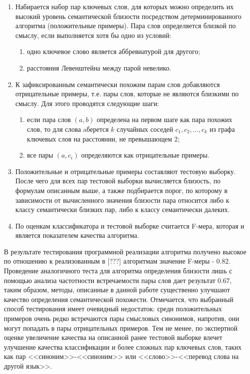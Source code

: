 \begin{enumerate}
    \item Набирается набор пар ключевых слов, для которых можно  определить их высокий уровень семантической близости посредством детерминированного алгоритма (положительные примеры). Пара слов определяется близкой по смыслу, если выполняется хотя бы одно из условий:
    \begin{enumerate} 
        \item одно ключевое слово является аббревиатурой для другого;
        \item расстояния Левенштейна между парой невелико.
    \end{enumerate}
    \item К зафиксированным семантически похожим парам слов добавляются отрицательные примеры, т.е. пары слов, которые не являются близкими по смыслу. Для этого проводятся следующие шаги:
        \begin{enumerate}
            \item если пара слов $(a,b)$ определена на первом шаге как пара похожих слов, то для слова aберется $k$ случайных соседей $c_1, c_2, \dots,c_k$ из графа ключевых слов на расстоянии, не превышающем 2; 
            \item все пары $(a,c_i)$ определяются как отрицательные примеры.
        \end{enumerate}
    \item Положительные и отрицательные примеры составляют тестовую выборку. После чего для всех пар тестовой выборки вычисляется близость, по формулам описанным выше, а также подбирается порог, по которому в зависимости от вычисленного значения близости пара относится либо к классу семантически близких пар, либо к классу семантически далеких.
    \item По оценкам классификатора и тестовой выборке считается F-мера, которая и является показателем качества алгоритма.
\end{enumerate}

В результате тестирования программной реализации алгоритма получено высокое  по отношению к реализованным в [???] алгоритмам значение F-меры - 0.82. Проведение аналогичного теста для алгоритма определения близости лишь с помощью анализа частотности встречаемости пары слов дает результат 0.67, таким образом, методы, описанные в данной работе существенно улучшают качество определения семантической похожести. Отмечается, что выбранный способ тестирования имеет очевидный недостаток: среди положительных примеров очень редко встречаются пары смысловых синонимов, напротив, они могут попадать в пары отрицательных примеров. Тем не менее, по экспертной оценке увеличение качества на описанной ранее тестовой выборке влечет улучшение качества классификации и более сложных пар ключевых слов, таких как  пар <<синоним>>-<<синоним>> или <<слово>>-<<перевод слова на другой язык>>.

